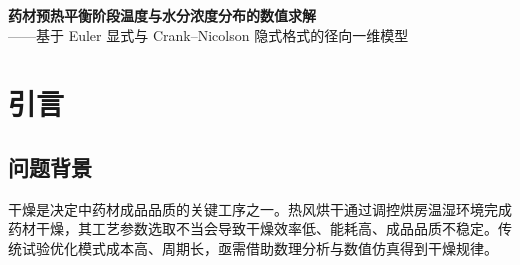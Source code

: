\documentclass[12pt,a4paper]{ctexart}
\begin{document}
\begin{center}
{\Large\bfseries 药材预热平衡阶段温度与水分浓度分布的数值求解}\\[6pt]
{\normalsize ——基于 Euler 显式与 Crank--Nicolson 隐式格式的径向一维模型}
\end{center}

\begin{abstract}
\noindent 药材干燥是中药材品质控制的关键工序，预热平衡阶段内部温度与水分浓度的时空演化规律直接影响后续恒温干燥的工艺设定。本文针对给定半径 $2$ cm、长 $25$ cm 的圆柱形药材，建立径向一维非稳态热质传递模型，求解前 $30$ min 内药材内部温度与含水率的时空分布。

对于问题一，首先依据长径比与特征扩散长度将问题降维为无限长圆柱的径向一维问题，建立热传导方程与水分扩散方程；其次\textbf{完整实现 Euler 显式（向前 Euler）方法}，把径向节点严格划分为\textbf{中心点、内部点、边界点}三类分别离散：中心点用 L'H\^opital 法则消去 $1/r$ 奇异项并结合轴对称条件，内部点用柱坐标守恒型中心差分，边界点用 Robin 对流边界的半控制体积离散；显式格式逐点推进、无需解线性方程组、对变扩散系数 $D(C)$ 亦无需迭代，但受抛物型 CFL 稳定条件 $Fo=\alpha\Delta t/\Delta r^2\le0.41$ 限制（柱坐标下略严于笛卡尔情形的 $1/2$）。在此基础上\textbf{引入 Crank--Nicolson 隐式格式与 Thomas 追赶法}，将时间精度由一阶提升至二阶、并解除 CFL 限制实现无条件稳定，三对角方程组由 Thomas 追赶法以 $O(N)$ 复杂度求解。

结果表明，热扩散系数约为水分扩散系数的 $34$ 倍（$\mathrm{Fo}_T=0.760$、$\mathrm{Fo}_C=0.0222$），$1800$ s 时温度场已整体抬升（中心 $33.575$ $^\circ$C、表面 $36.785$ $^\circ$C、径向温差 $3.21$ $^\circ$C），而水分场仅外层约 $1.5$ cm 壳体失水（表面含水率降幅 $40.70\%$、体积平均降幅 $10.11\%$）。数值验证表明：Euler 显式与 CN 在 $\Delta t=1$ s 下四位小数一致；CN 格式可放大时间步 $300$ 倍而不失稳，显式格式在 $Fo>0.41$ 时迅速发散。本文结论可为预热平衡阶段的工艺时间窗口提供定量依据。

\noindent\textbf{关键词：}径向一维热质传递；Euler 显式方法；Crank--Nicolson 格式；Thomas 追赶法；CFL 稳定性
\end{abstract}

\tableofcontents
\newpage

\section{引言}
\subsection{问题背景}
干燥是决定中药材成品品质的关键工序之一。热风烘干通过调控烘房温湿环境完成药材干燥，其工艺参数选取不当会导致干燥效率低、能耗高、成品品质不稳定。传统试验优化模式成本高、周期长，亟需借助数理分析与数值仿真得到干燥规律。
\end{document}
